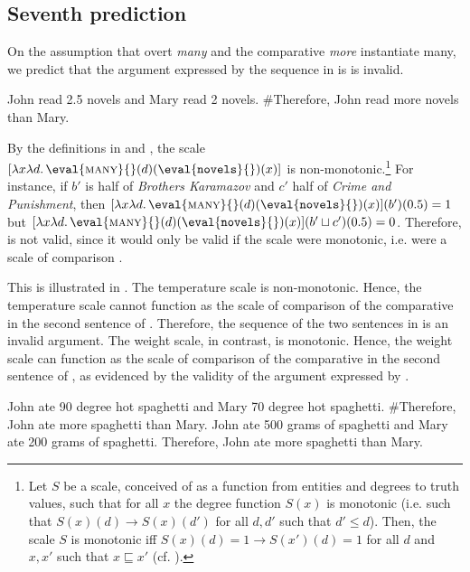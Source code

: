 \documentclass[output=paper]{langscibook}
\begin{document}
\subsection{Seventh prediction} 

On the assumption that overt \textit{many} and the comparative \textit{more} instantiate {\sc many}, we predict that the argument expressed by the sequence in  is is invalid.

\ea John read 2.5 novels and Mary read 2 novels. \#Therefore, John read more novels than Mary.\label{hai-tri:ManyComp}
\z

\noindent By the definitions in  and , the scale $[\lambda x\lambda d.\,\eval{\mbox{\sc many}}{}(d)(\eval{\mbox{\ttfamily novels}}{})(x)]$ is non-monotonic.\footnote{Let $S$ be a scale, conceived of as a function from entities and degrees to truth values, such that for all $x$ the degree function $S(x)$ is monotonic (i.e. such that $S(x)(d)\rightarrow S(x)(d')$ for all $d,d'$ such that $d'\le d$). Then, the scale $S$ is monotonic iff $S(x)(d)=1\rightarrow S(x')(d)=1$ for all $d$ and $x,x'$ such that $x\sqsubseteq x'$ (cf. \citealt{Krifka:1989,Schwarzschild:2002}).} For instance, if $b'$ is half of \textit{Brothers Karamazov} and $c'$ half of \textit{Crime and Punishment}, then $[\lambda x\lambda d.\,\eval{\mbox{\sc many}}{}(d)(\eval{\mbox{\ttfamily novels}}{})(x)](b')(0.5)=1$ but $[\lambda x\lambda d.\,\eval{\mbox{\sc many}}{}(d)(\eval{\mbox{\ttfamily novels}}{})(x)](b'\sqcup c')(0.5)=0$. Therefore,  is not valid, since it would only be valid if the scale were monotonic, i.e. were a scale of comparison \citep{WellwoodEtAl:2012}. 

This is illustrated in . The temperature scale is non-monotonic. Hence, the temperature scale cannot function as the scale of comparison of the comparative in the second sentence of . Therefore, the sequence of the two sentences in  is an invalid argument. The weight scale, in contrast, is monotonic.  Hence, the weight scale can function as the scale of comparison of the comparative in the second sentence of , as evidenced by the validity of the argument expressed by .

\ea \label{hai-tri:non-mon}
\ea John ate 90 degree hot spaghetti and Mary 70 degree hot spaghetti. \#Therefore, John ate more spaghetti than Mary. \label{hai-tri:non-mon-a}
\ex John ate 500 grams of spaghetti and Mary ate 200 grams of spaghetti. Therefore, John ate more spaghetti than Mary. \label{hai-tri:non-mon-b}
\z
\z
\end{document}
